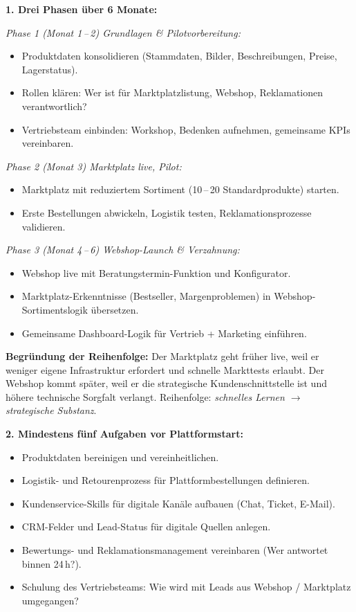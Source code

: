 \documentclass[11pt,a4paper,oneside]{article}
\begin{document}
\begin{loesungbox}
\textbf{1. Drei Phasen über 6 Monate:}

\smallskip
\emph{Phase 1 (Monat 1\,--\,2) \textendash{} Grundlagen \& Pilotvorbereitung:}
\begin{itemize}
  \item Produktdaten konsolidieren (Stammdaten, Bilder, Beschreibungen, Preise, Lagerstatus).
  \item Rollen klären: Wer ist für Marktplatzlistung, Webshop, Reklamationen verantwortlich?
  \item Vertriebsteam einbinden: Workshop, Bedenken aufnehmen, gemeinsame KPIs vereinbaren.
\end{itemize}

\emph{Phase 2 (Monat 3) \textendash{} Marktplatz live, Pilot:}
\begin{itemize}
  \item Marktplatz mit reduziertem Sortiment (10\,--\,20 Standardprodukte) starten.
  \item Erste Bestellungen abwickeln, Logistik testen, Reklamationsprozesse validieren.
\end{itemize}

\emph{Phase 3 (Monat 4\,--\,6) \textendash{} Webshop-Launch \& Verzahnung:}
\begin{itemize}
  \item Webshop live mit Beratungstermin-Funktion und Konfigurator.
  \item Marktplatz-Erkenntnisse (Bestseller, Margenproblemen) in Webshop-Sortimentslogik übersetzen.
  \item Gemeinsame Dashboard-Logik für Vertrieb + Marketing einführen.
\end{itemize}

\smallskip
\textbf{Begründung der Reihenfolge:} Der Marktplatz geht früher live, weil er weniger eigene Infrastruktur erfordert und schnelle Markttests erlaubt. Der Webshop kommt später, weil er die strategische Kundenschnittstelle ist und höhere technische Sorgfalt verlangt. Reihenfolge: \emph{schnelles Lernen $\rightarrow$ strategische Substanz}.

\smallskip
\textbf{2. Mindestens fünf Aufgaben vor Plattformstart:}
\begin{itemize}
  \item Produktdaten bereinigen und vereinheitlichen.
  \item Logistik- und Retourenprozess für Plattformbestellungen definieren.
  \item Kundenservice-Skills für digitale Kanäle aufbauen (Chat, Ticket, E-Mail).
  \item CRM-Felder und Lead-Status für digitale Quellen anlegen.
  \item Bewertungs- und Reklamationsmanagement vereinbaren (Wer antwortet binnen 24\,h?).
  \item Schulung des Vertriebsteams: Wie wird mit Leads aus Webshop / Marktplatz umgegangen?
\end{itemize}


\end{loesungbox}
\end{document}

